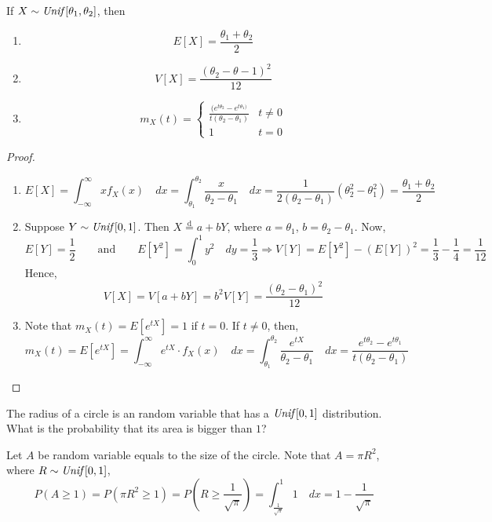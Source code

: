 \begin{theorem}
If $X \sim \text{\emph{Unif}}[\theta_1, \theta_2]$, then
\begin{enumerate}[noitemsep, topsep=0em]
\item  \[  E[X] = \frac{\theta_1 + \theta_2}{2}                              \]
\item  \[  V[X] = \frac{(\theta_2 - \theta-1)^2}{12}                         \]
\item 
\[
    m_X(t) = \begin{cases}
        \frac{(e^{t\theta_2} - e^{t\theta_1)}}{t(\theta_2 - \theta_1)} 
            & t \neq 0                                                       \\
        1
            & t = 0
    \end{cases}
\]    
\end{enumerate}
\end{theorem}
\begin{proof}\quad                                                           \\
\begin{enumerate}[noitemsep, topsep=0em]
\item
\[
    E[X] = \int_{-\infty}^{\infty} x f_X(x) \quad dx
         = \int_{\theta_1}^{\theta_2} \frac{x}{\theta_2 - \theta_1} \quad dx   
         = \frac{1}{2(\theta_2 - \theta_1)}(\theta_2^2 - \theta_1^2)
         = \frac{\theta_1 + \theta_2}{2}
\]
\item
    Suppose $Y \sim \text{\emph{Unif}}[0, 1]$. Then $X \overset{\text{d}}{=} a +
bY$, where $a = \theta_1$, $b = \theta_2 - \theta_1$. Now,
\[
    E[Y] = \frac{1}{2}
    \qquad \text{and} \qquad
    E[Y^2] = \int_{0}^{1} y^2 \quad dy = \frac{1}{3}
    \Rightarrow
    V[Y] = E[Y^2] - (E[Y])^2
         = \frac{1}{3} - \frac{1}{4}
         = \frac{1}{12}
\]
Hence,
\[
    V[X] = V[a + bY] = b^2 V[Y]
         = \frac{(\theta_2 - \theta_1)^2}{12}
\]
\item
    Note that $m_X(t) = E[e^{tX}] = 1$ if $t = 0$. If $t \neq 0$, then,
\[
    m_X(t) = E[e^{tX}] 
           = \int_{-\infty}^{\infty} e^{tX} \cdot f_X(x) \quad dx
           = \int_{\theta_1}^{\theta_2} \frac{e^{tX}}{\theta_2 - \theta_1} 
             \quad dx
           = \frac{e^{t\theta_2} - e^{t\theta_1}}{t(\theta_2 - \theta_1)}
\]
\end{enumerate}
\end{proof}

\begin{example}
The radius of a circle is an random variable that has a $\text{\emph{Unif}}[0, 1]$
distribution. What is the probability that its area is bigger than $1$?
\end{example}
\begin{solution}
Let $A$ be random variable equals to the size of the circle. Note that $A =
\pi R^2$, where $R \sim \text{\emph{Unif}}[0, 1]$,
\[
    P(A \geq 1) = P(\pi R^2 \geq 1)
                = P(R \geq \frac{1}{\sqrt{\pi}})
                = \int_{\frac{1}{\sqrt{\pi}}}^{1} 1 \quad dx
                = 1 - \frac{1}{\sqrt{\pi}}
\]
\end{solution}

